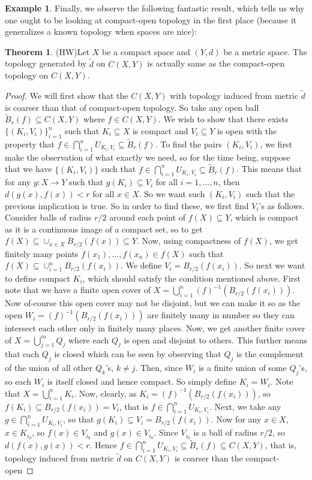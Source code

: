 \documentclass[letterpaper,11pt,twoside]{article}
\theoremstyle{definition}
\theoremstyle{definition}
\newtheorem{theorem}[proposition]{Theorem}
\theoremstyle{definition}
\theoremstyle{definition}
\theoremstyle{definition}
\newtheorem*{example}{\textbf{Example}}
\theoremstyle{definition}
\theoremstyle{remark}
\theoremstyle{definition}
\newcommand{\inv}[1]{\left(#1\right)^{-1}}
\newcommand{\union}[0]{\cup}
\newcommand{\bunion}[0]{\bigcup}
\newcommand{\bintrs}[0]{\bigcap}
\begin{document}
\begin{example}
    Finally, we observe the following fantastic result, which tells us why one ought to be looking at compact-open topology in the first place (because it generalizes a known topology when spaces are nice):
    \begin{theorem}(HW)\label{T-2.0.4}
        Let $X$ be a compact space and $(Y,d)$ be a metric space. The topology generated by $\tilde{d}$ on $C(X,Y)$ is actually same as the compact-open topology on $C(X,Y)$.
    \end{theorem}
    \begin{proof}
        We will first show that the $C(X,Y)$ with topology induced from metric $\tilde{d}$ is coarser than that of compact-open topology. So take any open ball $\tilde{B}_r(f) \subseteq C(X,Y)$ where $f\in C(X,Y)$. We wish to show that there exists $\{(K_i,V_i)\}_{i=1}^n$ such that $K_i\subseteq X$ is compact and $V_i\subseteq Y$ is open with the property that $f\in \bigcap_{i=1}^n U_{K_i,V_i} \subseteq \tilde{B}_r(f)$. To find the pairs $(K_i,V_i)$, we first make the observation of what exactly we need, so for the time being, suppose that we have $\{(K_i,V_i)\}$ such that $f\in \bigcap_{i=1}^n U_{K_i,V_i} \subseteq \tilde{B}_r(f)$. This means that for any $g : X\to Y$ such that $g(K_i) \subseteq V_i$ for all $i=1,\dots,n$, then $d(g(x),f(x)) < r$ for all $x\in X$. So we want such $(K_i,V_i)$ such that the previous implication is true. So in order to find these, we first find $V_i$'s as follows. Consider balls of radius $r/2$ around each point of $f(X)\subseteq Y$, which is compact as it is a continuous image of a compact set, so to get $f(X) \subseteq \cup_{x\in X} B_{r/2}(f(x)) \subseteq Y$. Now, using compactness of $f(X)$, we get finitely many points $f(x_1),\dots, f(x_n) \in f(X)$ such that $f(X) \subseteq \union_{i=1}^n B_{r/2}(f(x_i))$. We define $V_i = B_{r/2}(f(x_i))$. So next we want to define compact $K_i$, which should satisfy the condition mentioned above. First note that we have a finite open cover of $X = \bunion_{i=1}^n \inv{f}(B_{r/2}(f(x_i)))$. Now of-course this open cover may not be disjoint, but we can make it so as the open $W_i = \inv{f}(B_{r/2}(f(x_i)))$ are finitely many in number so they can intersect each other only in finitely many places. Now, we get another finite cover of $X = \bunion_{j=1}^m Q_j$ where each $Q_j$ is open and disjoint to others. This further means that each $Q_j$ is closed which can be seen by observing that $Q_j$ is the complement of the union of all other $Q_k$'s, $k\neq j$. Then, since $W_i$ is a finite union of some $Q_j$'s, so each $W_i$ is itself closed and hence compact. So simply define $K_i = W_i$. Note that $X=\bunion_{i=1}^n K_i$. Now, clearly, as $K_i = \inv{f}(B_{r/2}(f(x_i)))$, so $f(K_i) \subseteq B_{r/2}(f(x_i)) = V_i$, that is $f\in \bintrs_{i=1}^n U_{K_i,V_i}$. Next, we take any $g\in \bintrs_{i=1}^n U_{K_i,V_i}$, so that $g(K_i) \subseteq V_i = B_{r/2}(f(x_i))$. Now for any $x\in X$, $x\in K_{i_0}$, so $f(x) \in V_{i_0}$ and $g(x) \in V_{i_0}$. Since $V_{i_0}$ is a ball of radius $r/2$, so $d(f(x),g(x)) < r$. Hence $f\in \bintrs_{i=1}^n U_{K_i,V_i} \subseteq \tilde{B}_r(f) \subseteq C(X,Y)$, that is, topology induced from metric $\tilde{d}$ on $C(X,Y)$ is coarser than the compact-open 
\end{proof}
\end{example}
\end{document}
